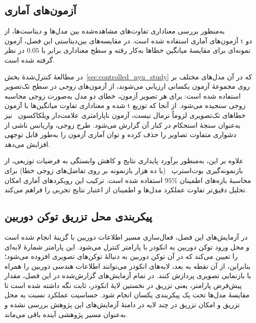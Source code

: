 \subsection{آزمون‌های آماری}
به‌منظور بررسی معناداری تفاوت‌های مشاهده‌شده
بین مدل‌ها و دیتاست‌ها،
از آزمون‌های آماری استفاده شده است.
در مقایسه‌های بین‌دیتاستی این فصل، آزمون t دو نمونه‌ای
برای مقایسهٔ میانگین خطاها به‌کار رفته
و سطح معناداری برابر با $0.05$ در نظر گرفته شده است.

در مطالعهٔ کنترل‌شدهٔ بخش~\ref{sec:controlled_nyu_study}
که در آن مدل‌های مختلف بر روی مجموعهٔ آزمون یکسانی ارزیابی می‌شوند،
از آزمون‌های \emph{زوجی} در سطح تک‌تصویر استفاده شده است:
برای هر تصویر آزمون، خطای دو مدل به‌صورت زوجی محاسبه شده
و معناداری تفاوت میانگین‌ها با آزمون t زوجی
سنجیده می‌شود.
از آنجا که توزیع خطاهای تک‌تصویری لزوماً نرمال نیست،
آزمون ناپارامتری علامت‌دار ویلکاکسون~\cite{Wilcoxon1945}
نیز به‌عنوان سنجهٔ استحکام در کنار آن گزارش می‌شود.
طرح زوجی، واریانس ناشی از دشواری متفاوت تصاویر را حذف کرده
و توان آماری آزمون را به‌طور قابل توجهی افزایش می‌دهد.

علاوه بر این، به‌منظور برآورد پایداری نتایج
و کاهش وابستگی به فرضیات توزیعی،
از بازنمونه‌گیری بوت‌استرپ~\cite{Efron1993Bootstrap}
(با ده هزار بازنمونه بر روی تفاضل‌های زوجی خطا)
برای محاسبهٔ بازه‌های اطمینان $95\%$ استفاده شده است.
ترکیب این رویکردهای آماری
امکان تحلیل دقیق‌تر تفاوت عملکرد مدل‌ها
و اطمینان از اعتبار نتایج تجربی را فراهم می‌کند.

\subsection{پیکربندی محل تزریق توکن دوربین}
\label{subsec:camera_token_injection}

در آزمایش‌های این فصل، فعال‌سازی مسیر اطلاعات دوربین با گزینهٔ  انجام شده است و محل ورود توکن دوربین به انکودر  با پارامتر  کنترل می‌شود. این پارامتر شمارهٔ لایه‌ای را تعیین می‌کند که در آن توکن دوربین به دنبالهٔ توکن‌های تصویری افزوده می‌شود؛ بنابراین، از آن نقطه به بعد، لایه‌های انکودر می‌توانند اطلاعات هندسی دوربین را همراه با بازنمایی تصویری پردازش کنند. در تمام آزمایش‌های گزارش‌شده در این فصل، مقدار پیش‌فرض پارامتر، یعنی تزریق در نخستین لایهٔ انکودر، ثابت نگه داشته شده است تا مقایسهٔ مدل‌ها تحت یک پیکربندی یکسان انجام شود. حساسیت عملکرد نسبت به محل تزریق و امکان تزریق در چند لایه در دامنهٔ آزمایش‌های این پژوهش بررسی نشده و به‌عنوان مسیر پژوهشی آینده باقی می‌ماند.

